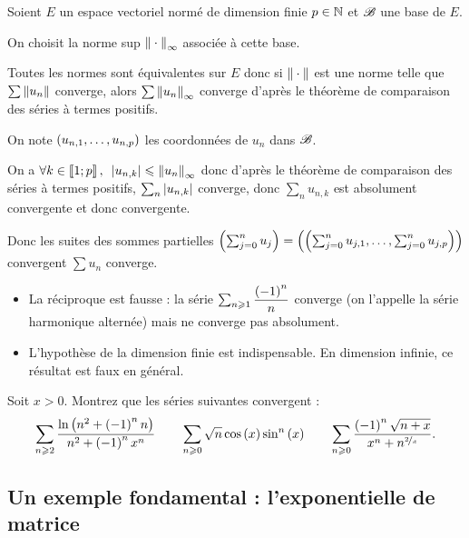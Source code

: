 \begin{dem}
Soient \(E\) un espace vectoriel normé de dimension finie \(p\in\mathbb{N}\) et \(\mathscr{B}\) une base de \(E\).

On choisit la norme sup \(\norme{}_\infty\) associée à cette base.

Toutes les normes sont équivalentes sur \(E\) donc si \(\norme{}\) est une norme telle que \(\sum\norme{u_n}\) converge, alors \(\sum\norme{u_n}_\infty\) converge d'après le théorème de comparaison des séries à termes positifs.

On note \(\left(u_{n,1},\dots,u_{n,p}\right)\) les coordonnées de \(u_n\) dans \(\mathscr{B}\).

On a \(\quantifs{\forall k\in\interventierii{1}{p}}\abs{u_{n,k}}\leq\norme{u_n}_\infty\) donc d'après le théorème de comparaison des séries à termes positifs, \(\sum_n\left\lvert u_{n,k}\right\rvert\) converge, donc \(\sum_nu_{n,k}\) est absolument convergente et donc convergente.

Donc les suites des sommes partielles \(\left(\sum_{j=0}^nu_j\right)=\left(\left(\sum_{j=0}^nu_{j,1},\dots,\sum_{j=0}^nu_{j,p}\right)\right)\) convergent \ie \(\sum u_n\) converge.
\end{dem}

\begin{rem}
\begin{itemize}
    \item La réciproque est fausse : la série \(\sum_{n\geqslant1}\dfrac{\left(-1\right)^n}{n}\) converge (on l'appelle la série harmonique alternée) mais ne converge pas absolument. \\
    \item L'hypothèse de la dimension finie est indispensable. En dimension infinie, ce résultat est faux en général.
\end{itemize}
\end{rem}

\begin{exo}
Soit \(x>0\). Montrez que les séries suivantes convergent : \[\sum_{n\geqslant2}\dfrac{\ln\left(n^2+\left(-1\right)^nn\right)}{n^2+\left(-1\right)^nx^n}\qquad\sum_{n\geqslant0}\sqrt{n}\cos\left(x\right)\sin^n\left(x\right)\qquad\sum_{n\geqslant0}\dfrac{\left(-1\right)^n\sqrt{n+x}}{x^n+n^{\nicefrac{2}{x}}}.\]
\end{exo}

\subsection{Un exemple fondamental : l'exponentielle de matrice}

